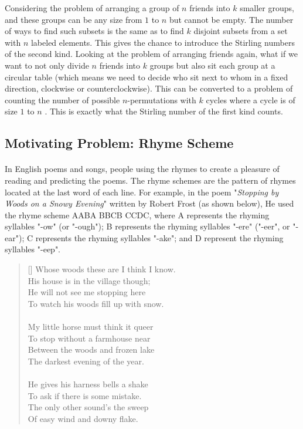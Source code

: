 \documentclass{article}
\theoremstyle{definition}
\theoremstyle{remark}
\theoremstyle{example}
\newcommand{\attrib}[1]{%
\nopagebreak{\raggedleft\footnotesize #1\par}}
\begin{document}
Considering the problem of arranging a group of $n$ friends into $k$ smaller groups, and these groups can be any size from $1$ to $n$ but cannot be empty. The number of ways to find such subsets is the same as to find $k$ disjoint subsets from a set with $n$ labeled elements. This gives the chance to introduce the Stirling numbers of the second kind. Looking at the problem of arranging friends again, what if we want to not only divide $n$ friends into $k$ groups but also sit each group at a circular table (which means we need to decide who sit next to whom in a fixed direction, clockwise or counterclockwise). This can be converted to a problem of counting the number of possible $n$-permutations with $k$ cycles where a cycle is of size $1$ to $n$ \cite{bona_combinatorics_2012}. This is exactly what the Stirling number of the first kind counts.

\subsection{Motivating Problem: Rhyme Scheme}\label{sec:2.2}
\paragraph{  }

In English poems and songs, people using the rhymes to create a pleasure of reading and predicting the poems. The rhyme schemes are the pattern of rhymes located at the last word of each line. For example, in the poem "\textit{Stopping by Woods on a Snowy Evening}" written by Robert Frost (as shown below), He used the rhyme scheme AABA BBCB CCDC, where A represents the rhyming syllables "-ow" (or "-ough"); B represents the rhyming syllables "-ere" ("-eer", or "-ear"); C represents the rhyming syllables "-ake"; and D represent the rhyming syllables "-eep".

\settowidth{\versewidth}{His house is in the village though;}
\begin{verse}[\versewidth]
Whose woods these are I think I know.\\
His house is in the village though;\\
He will not see me stopping here\\
To watch his woods fill up with snow.\\
\\
My little horse must think it queer\\
To stop without a farmhouse near\\
Between the woods and frozen lake\\
The darkest evening of the year.\\
\\
He gives his harness bells a shake\\
To ask if there is some mistake.\\
The only other sound’s the sweep\\
Of easy wind and downy flake.
\end{verse}
\attrib{Robert Frost (1874--1963)}
\end{document}
